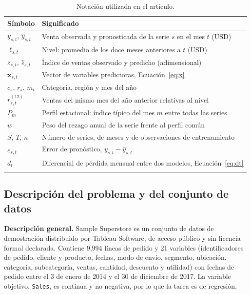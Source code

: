 \documentclass[pdflatex,sn-mathphys-num]{sn-jnl}
\begin{document}
\begin{table}[!htb]
\caption{Notación utilizada en el artículo.}\label{tab:notacion}
\begin{tabular}{@{}ll@{}}
\toprule
Símbolo & Significado \\
\midrule
$y_{s,t}$, $\hat{y}_{s,t}$ & Venta observada y pronosticada de la serie $s$ en el mes $t$ (USD) \\
$\ell_{s,t}$ & Nivel: promedio de los doce meses anteriores a $t$ (USD) \\
$z_{s,t}$, $\hat{z}_{s,t}$ & Índice de ventas observado y predicho (adimensional) \\
$\mathbf{x}_{s,t}$ & Vector de variables predictoras, Ecuación~\eqref{eq:x} \\
$c_s$, $r_s$, $m_t$ & Categoría, región y mes del año \\
$r^{(12)}_{s,t}$ & Ventas del mismo mes del año anterior relativas al nivel \\
$P_m$ & Perfil estacional: índice típico del mes $m$ entre todas las series \\
$w$ & Peso del rezago anual de la serie frente al perfil común \\
$S$, $T$, $n$ & Número de series, de meses y de observaciones de entrenamiento \\
$e_{s,t}$ & Error de pronóstico, $y_{s,t}-\hat{y}_{s,t}$ \\
$d_t$ & Diferencial de pérdida mensual entre dos modelos, Ecuación~\eqref{eq:dt} \\
\botrule
\end{tabular}
\end{table}

\subsection{Descripción del problema y del conjunto de datos}\label{subsec:datos}

\textbf{Descripción general.} Sample Superstore \cite{superstore} es un conjunto de datos de demostración distribuido por Tableau Software, de acceso público y sin licencia formal declarada. Contiene 9{,}994 líneas de pedido y 21 variables (identificadores de pedido, cliente y producto, fechas, modo de envío, segmento, ubicación, categoría, subcategoría, ventas, cantidad, descuento y utilidad) con fechas de pedido entre el 3 de enero de 2014 y el 30 de diciembre de 2017. La variable objetivo, \texttt{Sales}, es continua y no negativa, por lo que la tarea es de regresión.
\end{document}
